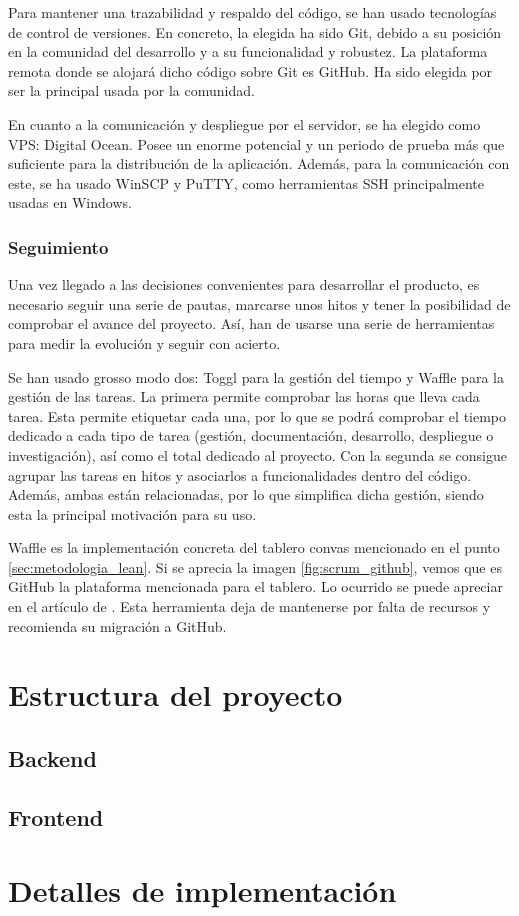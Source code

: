 Para mantener una trazabilidad y respaldo del código, se han usado tecnologías de control de versiones. En concreto, la elegida ha sido Git, debido a su posición en la comunidad del desarrollo y a su funcionalidad y robustez. La plataforma remota donde se alojará dicho código sobre Git es GitHub. Ha sido elegida por ser la principal usada por la comunidad.

En cuanto a la comunicación y despliegue por el servidor, se ha elegido como VPS: Digital Ocean. Posee un enorme potencial y un periodo de prueba más que suficiente para la distribución de la aplicación. Además, para la comunicación con este, se ha usado WinSCP y PuTTY, como herramientas SSH principalmente usadas en Windows.

\subsubsection{Seguimiento}

Una vez llegado a las decisiones convenientes para desarrollar el producto, es necesario seguir una serie de pautas, marcarse unos hitos y tener la posibilidad de comprobar el avance del proyecto. Así, han de usarse una serie de herramientas para medir la evolución y seguir con acierto.

Se han usado grosso modo dos: Toggl para la gestión del tiempo y Waffle para la gestión de las tareas. La primera permite comprobar las horas que lleva cada tarea. Esta permite etiquetar cada una, por lo que se podrá comprobar el tiempo dedicado a cada tipo de tarea (gestión, documentación, desarrollo, despliegue o investigación), así como el total dedicado al proyecto. Con la segunda se consigue agrupar las tareas en hitos y asociarlos a funcionalidades dentro del código. Además, ambas están relacionadas, por lo que simplifica dicha gestión, siendo esta la principal motivación para su uso.

Waffle es la implementación concreta del tablero convas mencionado en el punto \ref{sec:metodologia_lean}. Si se aprecia la imagen \ref{fig:scrum_github}, vemos que es GitHub la plataforma mencionada para el tablero. Lo ocurrido se puede apreciar en el artículo de . Esta herramienta deja de mantenerse por falta de recursos y recomienda su migración a GitHub.

\section{Estructura del proyecto}\label{sec:estructra_proyecto}

\subsection{Backend}

\subsection{Frontend}

\section{Detalles de implementación}\label{sec:detalles_implementacion}